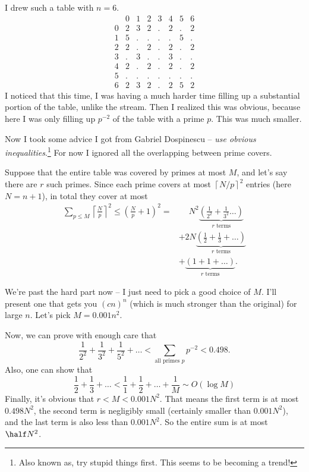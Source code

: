 \documentclass[11pt]{scrartcl}
\begin{document}
I drew such a table with $n=6$.
\[
  \begin{array}{r|ccccccc}
      & 0 & 1 & 2 & 3 & 4 & 5 & 6 \\ \hline
    0 & 2 & 3 & 2 & . & 2 & . & 2 \\
    1 & 5 & . & . & . & . & 5 & . \\
    2 & 2 & . & 2 & . & 2 & . & 2 \\
    3 & . & 3 & . & . & 3 & . & . \\
    4 & 2 & . & 2 & . & 2 & . & 2 \\
    5 & . & . & . & . & . & . & . \\
    6 & 2 & 3 & 2 & . & 2 & 5 & 2
  \end{array}
  \]
I noticed that this time, I was having a much harder time filling up a substantial portion of the table, unlike the stream.
Then I realized this was obvious, because here I was only filling up $p^{-2}$ of the table with a prime $p$.
This was much smaller.

Now I took some advice I got from Gabriel Dospinescu -- \emph{use obvious inequalities}.\footnote{Also known as, try stupid things first. This seems to be becoming a trend!}
For now I ignored all the overlapping between prime covers.

Suppose that the entire table was covered by primes at most $M$, and let's say there are $r$ such primes.
Since each prime covers at most $\left\lceil N/p \right\rceil^2$ entries (here $N = n+1$), in total they cover at most
\begin{align*}
  \sum_{p \le M} \left\lceil \frac Np \right\rceil^2 \le \left( \frac Np +1\right)^2
  =&\phantom+ N^2 \underbrace{\left( \frac{1}{2^2} + \frac{1}{3^2} \dots \right)}_{\text{$r$ terms}} \\
  &+ 2N \underbrace{\left( \frac12 + \frac 13 + \dots   \right)}_{\text{$r$ terms}} \\
  &+ \underbrace{\left( 1+1+\dots \right)}_{\text{$r$ terms}}.
\end{align*}

We're past the hard part now -- I just need to pick a good choice of $M$.
I'll present one that gets you $(cn)^n$ (which is much stronger than the original) for large $n$.
Let's pick $M=0.001n^2$.

Now, we can prove with enough care that
\[ \frac{1}{2^2} + \frac{1}{3^2} + \frac{1}{5^2} + \dots < \sum_{\text{all primes $p$}} p^{-2} <  0.498. \]
Also, one can show that \[ \frac12 + \frac 13 + \dots < \frac11 + \frac12 + \dots + \frac 1M \sim O(\log M) \]
Finally, it's obvious that $r < M < 0.001N^2$.
That means the first term is at most $0.498N^2$, the second term is negligibly small (certainly smaller than $0.001N^2$), and the last term is also less than $0.001N^2$.
So the entire sum is at most $\half N^2$.
\end{document}
